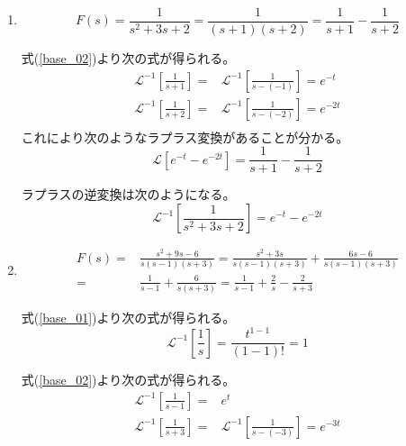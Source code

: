 \documentclass[12pt,b5paper]{ltjsarticle}
\begin{document}
\begin{enumerate}
 \item

      \begin{equation}
       F(s) = \frac{1}{s^2+3s+2}
        = \frac{1}{(s+1)(s+2)}
        = \frac{1}{s+1} - \frac{1}{s+2}
      \end{equation}

      式(\ref{base_02})より次の式が得られる。
      \begin{align}
       \mathcal{L}^{-1}\left[ \frac{1}{s+1} \right]
        =& \mathcal{L}^{-1}\left[ \frac{1}{s-(-1)} \right]
        = e^{-t}\\
       \mathcal{L}^{-1}\left[ \frac{1}{s+2} \right]
        =& \mathcal{L}^{-1}\left[ \frac{1}{s-(-2)} \right]
        = e^{-2t}\\
      \end{align}
      これにより次のようなラプラス変換があることが分かる。
      \begin{equation}
       \mathcal{L}\left[ e^{-t}-e^{-2t} \right] = \frac{1}{s+1} - \frac{1}{s+2}
      \end{equation}

      ラプラスの逆変換は次のようになる。
      \begin{equation}
       \mathcal{L}^{-1}\left[ \frac{1}{s^2+3s+2} \right]
        = e^{-t}-e^{-2t}
      \end{equation}

 \item

      \begin{align}
       F(s) =& \frac{s^2+9s-6}{s(s-1)(s+3)}
        = \frac{s^2+3s}{s(s-1)(s+3)} + \frac{6s-6}{s(s-1)(s+3)}\\
        =& \frac{1}{s-1} + \frac{6}{s(s+3)}
        = \frac{1}{s-1} + \frac{2}{s} - \frac{2}{s+3}
      \end{align}

      式(\ref{base_01})より次の式が得られる。
      \begin{equation}
       \mathcal{L}^{-1}\left[ \frac{1}{s} \right]
        = \frac{t^{1-1}}{(1-1)!}
        =1
      \end{equation}
      
      式(\ref{base_02})より次の式が得られる。
      \begin{align}
       \mathcal{L}^{-1}\left[ \frac{1}{s-1} \right]
       =& e^{t} \\
       \mathcal{L}^{-1}\left[ \frac{1}{s+3} \right]
        =& \mathcal{L}^{-1}\left[ \frac{1}{s-(-3)} \right]
        = e^{-3t}
      \end{align}


\end{enumerate}
\end{document}
